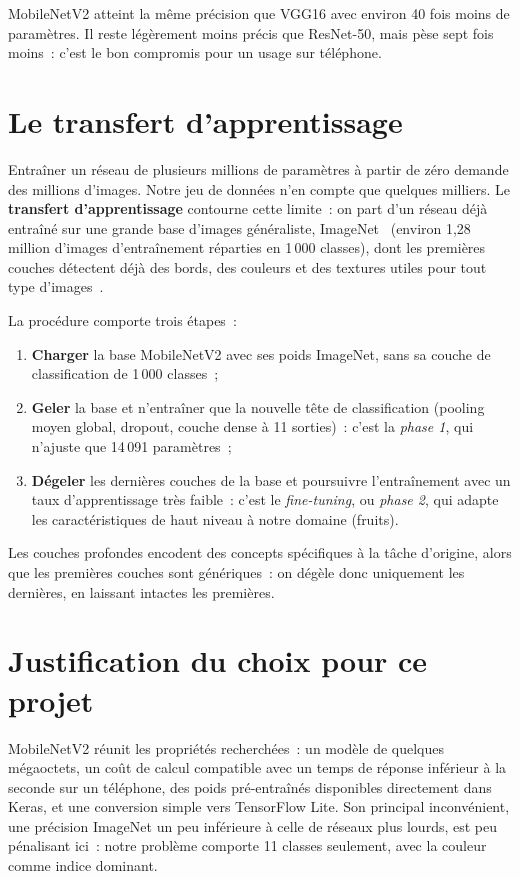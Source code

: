 MobileNetV2 atteint la même précision que VGG16 avec environ 40 fois moins de paramètres. Il reste légèrement moins précis que ResNet-50, mais pèse sept fois moins~: c’est le bon compromis pour un usage sur téléphone.

\section{Le transfert d’apprentissage}\label{sec:transfer}

Entraîner un réseau de plusieurs millions de paramètres à partir de zéro demande des millions d’images. Notre jeu de données n’en compte que quelques milliers. Le \textbf{transfert d’apprentissage} contourne cette limite~: on part d’un réseau déjà entraîné sur une grande base d’images généraliste, ImageNet~\cite{deng2009} (environ 1,28 million d’images d’entraînement réparties en 1\,000 classes), dont les premières couches détectent déjà des bords, des couleurs et des textures utiles pour tout type d’images~\cite{yosinski2014}.

La procédure comporte trois étapes~:

\begin{enumerate}
  \item \textbf{Charger} la base MobileNetV2 avec ses poids ImageNet, sans sa couche de classification de 1\,000 classes~;
  \item \textbf{Geler} la base et n’entraîner que la nouvelle tête de classification (pooling moyen global, dropout, couche dense à 11 sorties)~: c’est la \emph{phase 1}, qui n’ajuste que 14\,091 paramètres~;
  \item \textbf{Dégeler} les dernières couches de la base et poursuivre l’entraînement avec un taux d’apprentissage très faible~: c’est le \emph{fine-tuning}, ou \emph{phase 2}, qui adapte les caractéristiques de haut niveau à notre domaine (fruits).
\end{enumerate}

Les couches profondes encodent des concepts spécifiques à la tâche d’origine, alors que les premières couches sont génériques~: on dégèle donc uniquement les dernières, en laissant intactes les premières.

\section{Justification du choix pour ce projet}

MobileNetV2 réunit les propriétés recherchées~: un modèle de quelques mégaoctets, un coût de calcul compatible avec un temps de réponse inférieur à la seconde sur un téléphone, des poids pré-entraînés disponibles directement dans Keras, et une conversion simple vers TensorFlow Lite. Son principal inconvénient, une précision ImageNet un peu inférieure à celle de réseaux plus lourds, est peu pénalisant ici~: notre problème comporte 11 classes seulement, avec la couleur comme indice dominant.
